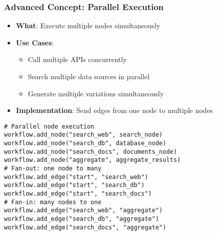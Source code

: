 \begin{frame}[fragile]\frametitle{Advanced Concept: Parallel Execution}
      \begin{itemize}
        \item \textbf{What}: Execute multiple nodes simultaneously
        \item \textbf{Use Cases}:
        \begin{itemize}
            \item Call multiple APIs concurrently
            \item Search multiple data sources in parallel
            \item Generate multiple variations simultaneously
        \end{itemize}
        \item \textbf{Implementation}: Send edges from one node to multiple nodes
      \end{itemize}
      
\begin{lstlisting}
# Parallel node execution
workflow.add_node("search_web", search_node)
workflow.add_node("search_db", database_node)
workflow.add_node("search_docs", documents_node)
workflow.add_node("aggregate", aggregate_results)
# Fan-out: one node to many
workflow.add_edge("start", "search_web")
workflow.add_edge("start", "search_db")
workflow.add_edge("start", "search_docs")
# Fan-in: many nodes to one
workflow.add_edge("search_web", "aggregate")
workflow.add_edge("search_db", "aggregate")
workflow.add_edge("search_docs", "aggregate")
      \end{lstlisting}
\end{frame}


